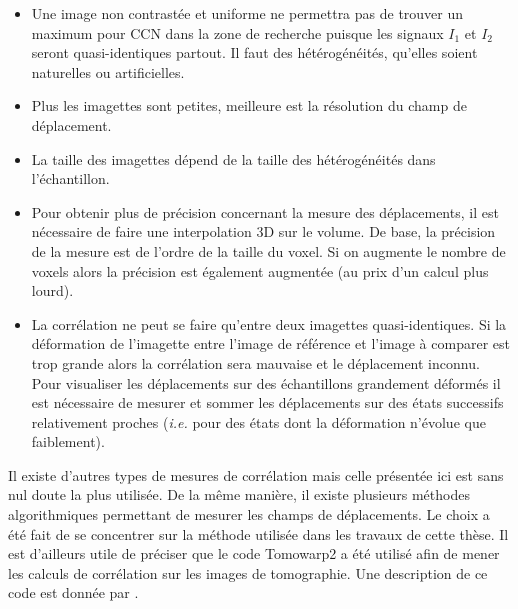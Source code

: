 		\begin{itemize}
			\item Une image non contrastée et uniforme ne permettra pas de trouver un maximum pour CCN dans la zone de recherche puisque les signaux $I_1$ et $I_2$ seront quasi-identiques partout. Il faut des hétérogénéités, qu'elles soient naturelles ou artificielles.
			\item Plus les imagettes sont petites, meilleure est la résolution du champ de déplacement.
			\item La taille des imagettes dépend de la taille des hétérogénéités dans l'échantillon.
			\item Pour obtenir plus de précision concernant la mesure des déplacements, il est nécessaire de faire une interpolation 3D sur le volume. De base, la précision de la mesure est de l'ordre de la taille du voxel. Si on augmente le nombre de voxels alors la précision est également augmentée (au prix d'un calcul plus lourd).
			\item La corrélation ne peut se faire qu'entre deux imagettes quasi-identiques. Si la déformation de l'imagette entre l'image de référence et l'image à comparer est trop grande alors la corrélation sera mauvaise et le déplacement inconnu. Pour visualiser les déplacements sur des échantillons grandement déformés il est nécessaire de mesurer et sommer les déplacements sur des états successifs relativement proches (\textit{i.e.} pour des états dont la déformation n'évolue que faiblement).
		\end{itemize}
		Il existe d'autres types de mesures de corrélation mais celle présentée ici est sans nul doute la plus utilisée. De la même manière, il existe plusieurs méthodes algorithmiques permettant de mesurer les champs de déplacements. Le choix a été fait de se concentrer sur la méthode utilisée dans les travaux de cette thèse. Il est d'ailleurs utile de préciser que le code Tomowarp2 a été utilisé afin de mener les calculs de corrélation sur les images de tomographie. Une description de ce code est donnée par \citet{tudisco_tomowarp2_2017}.

